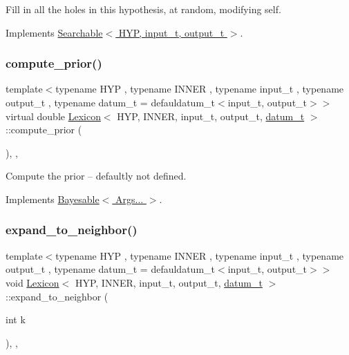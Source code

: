 Fill in all the holes in this hypothesis, at random, modifying self. 



Implements \hyperlink{class_searchable_a3ae6263b49a0f9da94f5dcc23af6618e}{Searchable$<$ H\+Y\+P, input\+\_\+t, output\+\_\+t $>$}.

\mbox{\label{class_lexicon_a2e099a68dd08d62897b40647f92eba1c}} 
\subsubsection{\texorpdfstring{compute\+\_\+prior()}{compute\_prior()}}
{\footnotesize\ttfamily template$<$typename H\+YP , typename I\+N\+N\+ER , typename input\+\_\+t , typename output\+\_\+t , typename datum\+\_\+t  = defauldatum\+\_\+t$<$input\+\_\+t, output\+\_\+t$>$$>$ \\
virtual double \hyperlink{class_lexicon}{Lexicon}$<$ H\+YP, I\+N\+N\+ER, input\+\_\+t, output\+\_\+t, \hyperlink{class_bayesable_a9f1a6c0cd7855550fa10b1a8f13a5867}{datum\+\_\+t} $>$\+::compute\+\_\+prior (\begin{DoxyParamCaption}{ }\end{DoxyParamCaption})\hspace{0.3cm}{\ttfamily [inline]}, {\ttfamily [override]}, {\ttfamily [virtual]}}



Compute the prior -- defaultly not defined. 



Implements \hyperlink{class_bayesable_a1b057a17212ced123545133e2297c01b}{Bayesable$<$ Args... $>$}.

\mbox{\label{class_lexicon_a2b17608f66415c6a7d55b6a8f344db21}} 
\subsubsection{\texorpdfstring{expand\+\_\+to\+\_\+neighbor()}{expand\_to\_neighbor()}}
{\footnotesize\ttfamily template$<$typename H\+YP , typename I\+N\+N\+ER , typename input\+\_\+t , typename output\+\_\+t , typename datum\+\_\+t  = defauldatum\+\_\+t$<$input\+\_\+t, output\+\_\+t$>$$>$ \\
void \hyperlink{class_lexicon}{Lexicon}$<$ H\+YP, I\+N\+N\+ER, input\+\_\+t, output\+\_\+t, \hyperlink{class_bayesable_a9f1a6c0cd7855550fa10b1a8f13a5867}{datum\+\_\+t} $>$\+::expand\+\_\+to\+\_\+neighbor (\begin{DoxyParamCaption}\item[{int}]{k }\end{DoxyParamCaption})\hspace{0.3cm}{\ttfamily [inline]}, {\ttfamily [override]}, {\ttfamily [virtual]}}




